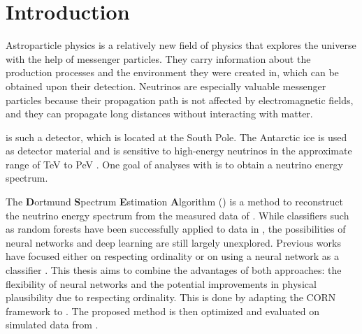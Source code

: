 \chapter{Introduction}
Astroparticle physics is a relatively new field of physics
  that explores the universe
    with the help of messenger particles.
They carry information about
    the production processes
    and the environment they were created in,
  which can be obtained upon their detection.
Neutrinos are especially valuable messenger particles
  because their propagation path is not affected by electromagnetic fields,
  and they can propagate long distances without interacting with matter.


\icecube{} is such a detector,
  which is located at the South Pole.
The Antarctic ice is used as detector material
  and is sensitive to high-energy neutrinos
    in the approximate range of \si{\tera\electronvolt} to \si{\peta\electronvolt} \cite{icecube_aartsen}.
%
One goal of analyses with \icecube{} is
  to obtain a neutrino energy spectrum.

The \textbf{D}ortmund \textbf{S}pectrum \textbf{E}stimation \textbf{A}lgorithm (\dsea{}) \cite{dsea_unification}
is a method to reconstruct the neutrino energy spectrum
  from the measured data of \icecube{}.
While classifiers such as random forests
have been successfully applied to \icecube{} data in \dsea{} \cite{hymon2021seasonal},
the possibilities of neural networks and deep learning are still largely unexplored. %
%
Previous works
have focused either
  on respecting ordinality \cite{dsea_jan} %
  or on using a neural network as a classifier \cite{dsea_samuel}.
This thesis aims to combine the advantages of both approaches:
  the flexibility of neural networks
  and the potential improvements in physical plausibility
    due to respecting ordinality.
This is done by adapting the
\acf{CORN} framework \cite{corn}
to \dsea{}.
The proposed method is then optimized and evaluated
  on simulated data from \icecube{}.

